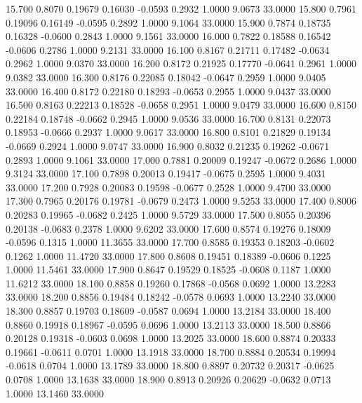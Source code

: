   15.700   0.8070   0.19679   0.16030  -0.0593   0.2932   1.0000   9.0673  33.0000
  15.800   0.7961   0.19096   0.16149  -0.0595   0.2892   1.0000   9.1064  33.0000
  15.900   0.7874   0.18735   0.16328  -0.0600   0.2843   1.0000   9.1561  33.0000
  16.000   0.7822   0.18588   0.16542  -0.0606   0.2786   1.0000   9.2131  33.0000
  16.100   0.8167   0.21711   0.17482  -0.0634   0.2962   1.0000   9.0370  33.0000
  16.200   0.8172   0.21925   0.17770  -0.0641   0.2961   1.0000   9.0382  33.0000
  16.300   0.8176   0.22085   0.18042  -0.0647   0.2959   1.0000   9.0405  33.0000
  16.400   0.8172   0.22180   0.18293  -0.0653   0.2955   1.0000   9.0437  33.0000
  16.500   0.8163   0.22213   0.18528  -0.0658   0.2951   1.0000   9.0479  33.0000
  16.600   0.8150   0.22184   0.18748  -0.0662   0.2945   1.0000   9.0536  33.0000
  16.700   0.8131   0.22073   0.18953  -0.0666   0.2937   1.0000   9.0617  33.0000
  16.800   0.8101   0.21829   0.19134  -0.0669   0.2924   1.0000   9.0747  33.0000
  16.900   0.8032   0.21235   0.19262  -0.0671   0.2893   1.0000   9.1061  33.0000
  17.000   0.7881   0.20009   0.19247  -0.0672   0.2686   1.0000   9.3124  33.0000
  17.100   0.7898   0.20013   0.19417  -0.0675   0.2595   1.0000   9.4031  33.0000
  17.200   0.7928   0.20083   0.19598  -0.0677   0.2528   1.0000   9.4700  33.0000
  17.300   0.7965   0.20176   0.19781  -0.0679   0.2473   1.0000   9.5253  33.0000
  17.400   0.8006   0.20283   0.19965  -0.0682   0.2425   1.0000   9.5729  33.0000
  17.500   0.8055   0.20396   0.20138  -0.0683   0.2378   1.0000   9.6202  33.0000
  17.600   0.8574   0.19276   0.18009  -0.0596   0.1315   1.0000  11.3655  33.0000
  17.700   0.8585   0.19353   0.18203  -0.0602   0.1262   1.0000  11.4720  33.0000
  17.800   0.8608   0.19451   0.18389  -0.0606   0.1225   1.0000  11.5461  33.0000
  17.900   0.8647   0.19529   0.18525  -0.0608   0.1187   1.0000  11.6212  33.0000
  18.100   0.8858   0.19260   0.17868  -0.0568   0.0692   1.0000  13.2283  33.0000
  18.200   0.8856   0.19484   0.18242  -0.0578   0.0693   1.0000  13.2240  33.0000
  18.300   0.8857   0.19703   0.18609  -0.0587   0.0694   1.0000  13.2184  33.0000
  18.400   0.8860   0.19918   0.18967  -0.0595   0.0696   1.0000  13.2113  33.0000
  18.500   0.8866   0.20128   0.19318  -0.0603   0.0698   1.0000  13.2025  33.0000
  18.600   0.8874   0.20333   0.19661  -0.0611   0.0701   1.0000  13.1918  33.0000
  18.700   0.8884   0.20534   0.19994  -0.0618   0.0704   1.0000  13.1789  33.0000
  18.800   0.8897   0.20732   0.20317  -0.0625   0.0708   1.0000  13.1638  33.0000
  18.900   0.8913   0.20926   0.20629  -0.0632   0.0713   1.0000  13.1460  33.0000
